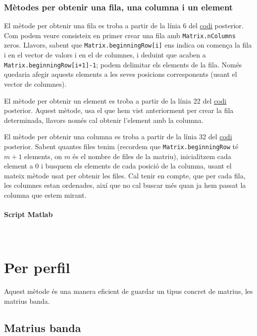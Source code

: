 \documentclass[11pt,a4paper,twoside]{report}
\begin{document}
	
	
	\subsubsection{Mètodes per obtenir una fila, una columna i un element}
	
	El mètode per obtenir una fila es troba a partir de la línia 6 del \hyperref[sec:codi1]{codi} posterior. Com podem veure consisteix en primer crear una fila amb \texttt{Matrix.nColumns} zeros.
	Llavors, sabent que \texttt{Matrix.beginningRow[i]} ens indica on comença la fila i en el vector de valors i en el de columnes, i deduint que acaben a \texttt{Matrix.beginningRow[i+1]-1}; podem delimitar els elements de la fila. Només quedaria afegir aquests elements a les seves posicions corresponents (usant el vector de columnes).
	
	El mètode per obtenir un element es troba a partir de la línia 22 del \hyperref[sec:codi1]{codi} posterior. Aquest mètode, usa el que hem vist anteriorment per crear la fila determinada, llavors només cal obtenir l'element amb la columna.
	
	El mètode per obtenir una columna es troba a partir de la línia 32 del \hyperref[sec:codi1]{codi} posterior. Sabent quantes files tenim (recordem que \texttt{Matrix.beginningRow} té $m+1$ elements, on $m$ és el nombre de files de la matriu), inicialitzem cada element a 0 i busquem els elements de cada posició de la columna, usant el mateix mètode usat per obtenir les files. Cal tenir en compte, que per cada fila, les columnes estan ordenades, així que no cal buscar més quan ja hem passat la columna que estem mirant.
	
	\paragraph*{Script Matlab} \mbox{} \\
	
	
	
	
	\section{Per perfil}
	
	 
	 Aquest mètode és una manera eficient de guardar un tipus concret de matrius, les matrius banda.
	 
	\subsection{Matrius banda}	 
	
\end{document}
